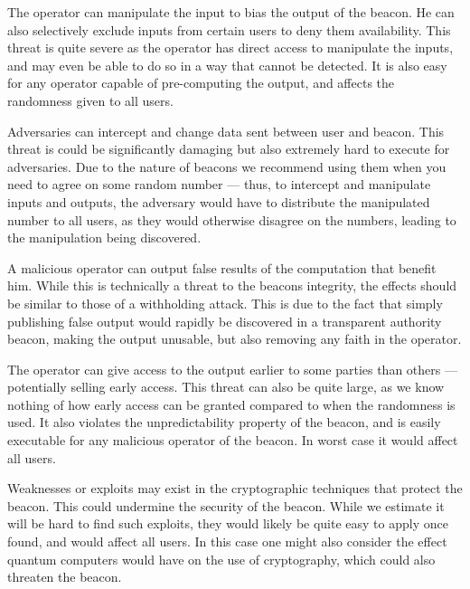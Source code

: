 The operator can manipulate the input to bias the output of the beacon.
He can also selectively exclude inputs from certain users to deny them availability.
This threat is quite severe as the operator has direct access to manipulate the inputs, and may even be able to do so in a way that cannot be detected.
It is also easy for any operator capable of pre-computing the output, and affects the randomness given to all users.

Adversaries can intercept and change data sent between user and beacon.
This threat is could be significantly damaging but also extremely hard to execute for adversaries.
Due to the nature of beacons we recommend using them when you need to agree on some random number --- thus, to intercept and manipulate inputs and outputs, the adversary would have to distribute the manipulated number to all users, as they would otherwise disagree on the numbers, leading to the manipulation being discovered.

A malicious operator can output false results of the computation that benefit him.
While this is technically a threat to the beacons integrity, the effects should be similar to those of a withholding attack.
This is due to the fact that simply publishing false output would rapidly be discovered in a transparent authority beacon, making the output unusable, but also removing any faith in the operator.

The operator can give access to the output earlier to some parties than others --- potentially selling early access.
This threat can also be quite large, as we know nothing of how early access can be granted compared to when the randomness is used.
It also violates the unpredictability property of the beacon, and is easily executable for any malicious operator of the beacon.
In worst case it would affect all users.

Weaknesses or exploits may exist in the cryptographic techniques that protect the beacon.
This could undermine the security of the beacon.
While we estimate it will be hard to find such exploits, they would likely be quite easy to apply once found, and would affect all users.
In this case one might also consider the effect quantum computers would have on the use of cryptography, which could also threaten the beacon.
